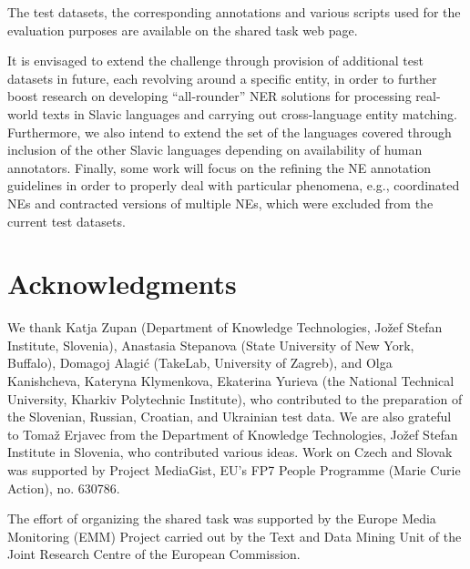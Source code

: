 \documentclass[11pt]{article}
\begin{document}
The test datasets, the corresponding annotations and various scripts used for the evaluation purposes 
are available on the shared task web page.

It is envisaged to extend the challenge through provision of additional test datasets in future, each revolving
around a specific entity, in order to further boost research on developing ``all-rounder'' NER solutions for 
processing real-world texts in Slavic languages and carrying out cross-language entity matching. Furthermore, 
we also intend to extend the set of the languages covered through inclusion of the other Slavic languages 
depending on availability of human annotators. Finally, some work will focus on the refining the NE annotation 
guidelines in order to properly deal with particular phenomena, e.g.,  coordinated NEs and contracted versions of multiple
NEs, which were excluded from the current test datasets.


\section*{Acknowledgments}


We thank Katja Zupan (Department of Knowledge Technologies, Jožef Stefan
Institute, Slovenia), Anastasia Stepanova (State University of New York,
Buffalo), Domagoj Alagić (TakeLab, University of Zagreb), and Olga
Kanishcheva, Kateryna Klymenkova, Ekaterina Yurieva (the National
Technical University, Kharkiv Polytechnic Institute), who contributed to
the preparation of the Slovenian, Russian, Croatian, and Ukrainian test
data.  
%
We are also grateful to Tomaž Erjavec from the Department of Knowledge
Technologies, Jožef Stefan Institute in Slovenia, who contributed various
ideas.
%
Work on Czech and Slovak was supported by Project MediaGist, EU's FP7
People Programme (Marie Curie Action), no. 630786.

The effort of organizing the shared task was supported by the Europe Media Monitoring (EMM) 
Project carried out by the Text and Data Mining Unit of the Joint Research Centre of the 
European Commission.



\end{document}
